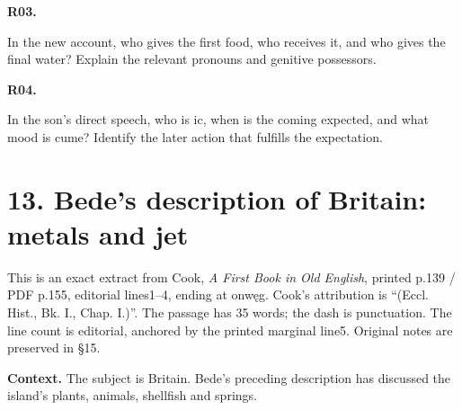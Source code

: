 \par\begin{minipage}{\linewidth}\raggedright
\textbf{R03.}

In the new account, who gives the first food, who receives it, and who gives the final water? Explain the relevant pronouns and genitive possessors.

\end{minipage}\par\addvspace{4pt}

\par\begin{minipage}{\linewidth}\raggedright
\textbf{R04.}

In the son’s direct speech, who is ic, when is the coming expected, and what mood is cume? Identify the later action that fulfills the expectation.

\end{minipage}\par\addvspace{4pt}

\section*{13. Bede’s description of Britain: metals and jet}

This is an exact extract from Cook, \emph{A First Book in Old English}, printed p.139 /\allowbreak{} PDF p.155, editorial lines1–4, ending at onwęg. Cook’s attribution is “(Eccl. Hist., Bk. I., Chap. I.)”. The passage has 35 words; the dash is punctuation. The line count is editorial, anchored by the printed marginal line5. Original notes are preserved in §15.

\textbf{Context.} The subject is Britain. Bede’s preceding description has discussed the island’s plants, animals, shellfish and springs.

\par\begin{minipage}{\linewidth}\raggedright

\end{minipage}\par
{}
